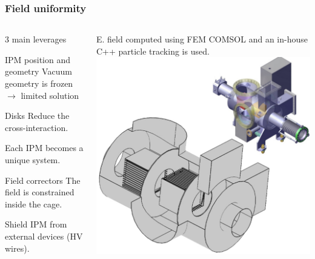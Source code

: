\begin{frame}[t]
  \frametitle{Field uniformity}
  \begin{columns}[T]
    \begin{column}{0.45\textwidth}
      3 main leverages
      \begin{block}{IPM position and geometry}
        Vacuum geometry is frozen $\rightarrow$ limited solution
      \end{block}
      \begin{block}{Disks}
        Reduce the cross-interaction.

        Each IPM becomes a unique system.
      \end{block}
      \begin{block}{Field correctors}
        The field is constrained inside the cage.

        Shield IPM from external devices (HV wires).
      \end{block}
    \end{column}
    \begin{column}{0.45\textwidth}
      E. field computed using FEM COMSOL and an in-house C++ particle tracking is used.
      \includegraphics[width=1\textwidth]{03_SIM/fig/fig003_COMSOL_LWU2}

    \end{column}
  \end{columns}
\end{frame}

